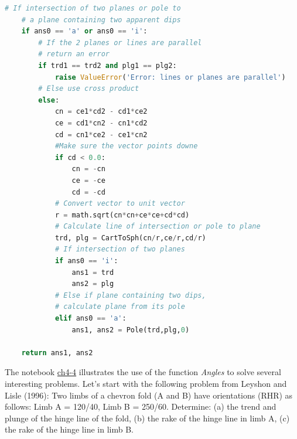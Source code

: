 \documentclass[a4paper , 12pt]{book}
\begin{document}
\begin{center}
\begin{lstlisting}[language=Python, frame=single]
    # If intersection of two planes or pole to 
    # a plane containing two apparent dips
    if ans0 == 'a' or ans0 == 'i':
        # If the 2 planes or lines are parallel 
        # return an error
        if trd1 == trd2 and plg1 == plg2:
            raise ValueError('Error: lines or planes are parallel')
        # Else use cross product
        else:
            cn = ce1*cd2 - cd1*ce2
            ce = cd1*cn2 - cn1*cd2
            cd = cn1*ce2 - ce1*cn2
            #Make sure the vector points downe
            if cd < 0.0:
                cn = -cn
                ce = -ce
                cd = -cd
            # Convert vector to unit vector
            r = math.sqrt(cn*cn+ce*ce+cd*cd)
            # Calculate line of intersection or pole to plane
            trd, plg = CartToSph(cn/r,ce/r,cd/r)
            # If intersection of two planes
            if ans0 == 'i':
                ans1 = trd
                ans2 = plg
            # Else if plane containing two dips, 
            # calculate plane from its pole
            elif ans0 == 'a':
                ans1, ans2 = Pole(trd,plg,0)
    
    return ans1, ans2
\end{lstlisting}    
\end{center}

The notebook \href{https://github.com/nfcd/compGeo/blob/master/source/notebooks/ch4-4.ipynb}{ch4-4} illustrates the use of the function \textit{Angles} to solve several interesting problems. Let's start with the following problem from Leyshon and Lisle (1996): Two limbs of a chevron fold (A and B) have orientations (RHR) as follows: Limb A = 120/40, Limb B = 250/60. Determine: (a) the trend and plunge of the hinge line of the fold, (b) the rake of the hinge line in limb A, (c) the rake of the hinge line in limb B. 
\end{document}
